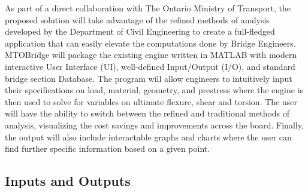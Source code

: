 \documentclass{article}
\begin{document}
As part of a direct collaboration with The Ontario Ministry of Transport, the proposed solution will take advantage of the refined methods of analysis developed by the Department of Civil Engineering to create a full-fledged application that can easily elevate the computations done by Bridge Engineers. MTOBridge will package the existing engine written in MATLAB with modern interactive User Interface (UI), well-defined Input/Output (I/O), and standard bridge section Database. The program will allow engineers to intuitively input their specifications on load, material, geometry, and prestress where the engine is then used to solve for variables on ultimate flexure, shear and torsion. The user will have the ability to switch between the refined and traditional methods of analysis, visualizing the cost savings and improvements across the board. Finally, the output will also include interactable graphs and charts where the user can find further specific information based on a given point. 


\subsection{Inputs and Outputs}



\end{document}
